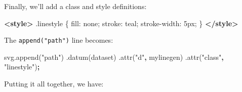 \documentclass[openany]{book}
\newenvironment{Shaded}{\begin{snugshade}}{\end{snugshade}}
\newcommand{\AttributeTok}[1]{\textcolor[rgb]{0.77,0.63,0.00}{#1}}
\newcommand{\DecValTok}[1]{\textcolor[rgb]{0.00,0.00,0.81}{#1}}
\newcommand{\FunctionTok}[1]{\textcolor[rgb]{0.00,0.00,0.00}{#1}}
\newcommand{\KeywordTok}[1]{\textcolor[rgb]{0.13,0.29,0.53}{\textbf{#1}}}
\newcommand{\NormalTok}[1]{#1}
\newcommand{\OperatorTok}[1]{\textcolor[rgb]{0.81,0.36,0.00}{\textbf{#1}}}
\newcommand{\StringTok}[1]{\textcolor[rgb]{0.31,0.60,0.02}{#1}}
\newcommand{\VariableTok}[1]{\textcolor[rgb]{0.00,0.00,0.00}{#1}}
\begin{document}
Finally, we'll add a class and style definitions:

\begin{Shaded}
\begin{Highlighting}[]
\KeywordTok{<style>}
  \FunctionTok{.linestyle}\NormalTok{ \{}
\NormalTok{    fill: }\DecValTok{none}\NormalTok{;}
\NormalTok{    stroke: }\DecValTok{teal}\NormalTok{;}
\NormalTok{    stroke-width: }\DecValTok{5px}\NormalTok{;}
\NormalTok{  \}}
\KeywordTok{</style>}
\end{Highlighting}
\end{Shaded}

The \texttt{append("path")} line becomes:

\begin{Shaded}
\begin{Highlighting}[]
\VariableTok{svg}\NormalTok{.}\AttributeTok{append}\NormalTok{(}\StringTok{"path"}\NormalTok{)}
\NormalTok{    .}\AttributeTok{datum}\NormalTok{(dataset)}
\NormalTok{    .}\AttributeTok{attr}\NormalTok{(}\StringTok{"d"}\OperatorTok{,}\NormalTok{ mylinegen)}
\NormalTok{    .}\AttributeTok{attr}\NormalTok{(}\StringTok{"class"}\OperatorTok{,} \StringTok{"linestyle"}\NormalTok{)}\OperatorTok{;}
\end{Highlighting}
\end{Shaded}

Putting it all together, we have:
\end{document}
